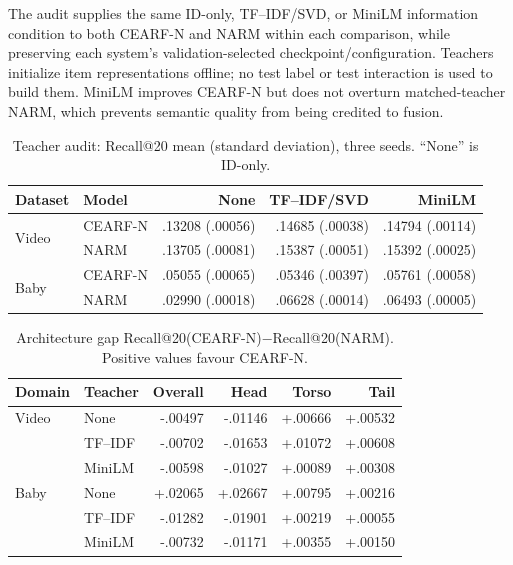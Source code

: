 \documentclass[runningheads]{llncs}
\newcommand{\method}{CEARF-N}
\begin{document}
The audit supplies the same ID-only, TF--IDF/SVD, or MiniLM information
condition to both \method{} and NARM within each comparison, while preserving
each system's validation-selected checkpoint/configuration. Teachers
initialize item representations offline; no test label or test interaction is
used to build them. MiniLM improves \method{} but does not overturn
matched-teacher NARM, which prevents semantic quality from being credited to
fusion.

\begin{table}[H]
\caption{Teacher audit: Recall@20 mean (standard deviation), three seeds.
``None'' is ID-only.}
\centering\small
\begin{tabular}{llrrr}
\toprule
Dataset & Model & None & TF--IDF/SVD & MiniLM\\
\midrule
\multirow{2}{*}{Video}
 & \method{} & .13208 (.00056) & .14685 (.00038) & .14794 (.00114)\\
 & NARM & .13705 (.00081) & .15387 (.00051) & .15392 (.00025)\\
\midrule
\multirow{2}{*}{Baby}
 & \method{} & .05055 (.00065) & .05346 (.00397) & .05761 (.00058)\\
 & NARM & .02990 (.00018) & .06628 (.00014) & .06493 (.00005)\\
\bottomrule
\end{tabular}
\end{table}

\begin{table}[H]
\caption{Architecture gap Recall@20(\method{})$-$Recall@20(NARM).
Positive values favour \method{}.}
\centering\small
\begin{tabular}{llrrrr}
\toprule
Domain & Teacher & Overall & Head & Torso & Tail\\
\midrule
Video & None & -.00497 & -.01146 & +.00666 & +.00532\\
      & TF--IDF & -.00702 & -.01653 & +.01072 & +.00608\\
      & MiniLM & -.00598 & -.01027 & +.00089 & +.00308\\
\midrule
Baby & None & +.02065 & +.02667 & +.00795 & +.00216\\
     & TF--IDF & -.01282 & -.01901 & +.00219 & +.00055\\
     & MiniLM & -.00732 & -.01171 & +.00355 & +.00150\\
\bottomrule
\end{tabular}
\end{table}
\end{document}

